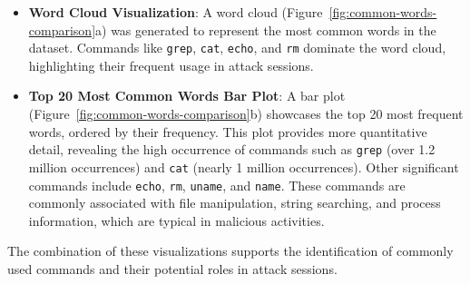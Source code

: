         \begin{itemize}
        
            \item \textbf{Word Cloud Visualization}: A word cloud (Figure~\ref{fig:common-words-comparison}a) was generated to represent the most common words in the dataset. Commands like \texttt{grep}, \texttt{cat}, \texttt{echo}, and \texttt{rm} dominate the word cloud, highlighting their frequent usage in attack sessions.
            
            \vspace{0.2em}

            \item \textbf{Top 20 Most Common Words Bar Plot}: A bar plot (Figure~\ref{fig:common-words-comparison}b) showcases the top 20 most frequent words, ordered by their frequency. This plot provides more quantitative detail, revealing the high occurrence of commands such as \texttt{grep} (over 1.2 million occurrences) and \texttt{cat} (nearly 1 million occurrences). Other significant commands include \texttt{echo}, \texttt{rm}, \texttt{uname}, and \texttt{name}. These commands are commonly associated with file manipulation, string searching, and process information, which are typical in malicious activities.
            
        \end{itemize}

        The combination of these visualizations supports the identification of commonly used commands and their potential roles in attack sessions. 

